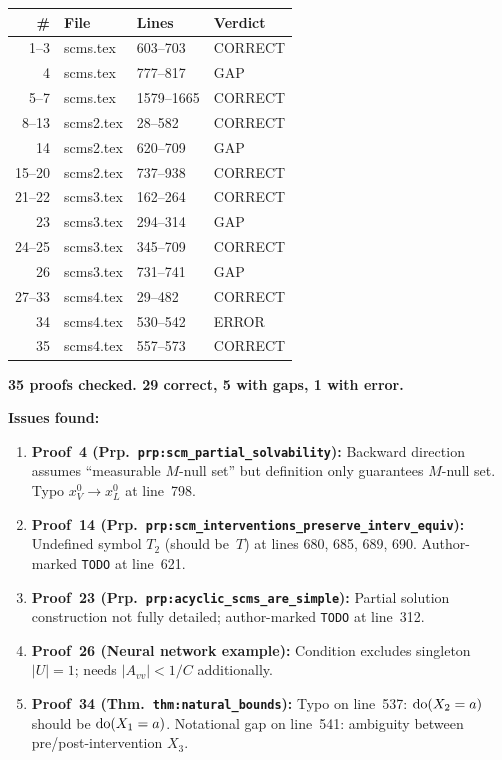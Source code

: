 \documentclass{article}
\begin{document}
\begin{center}
\begin{tabular}{r|l|l|l}
\textbf{\#} & \textbf{File} & \textbf{Lines} & \textbf{Verdict} \\ \hline
1--3   & scms.tex  & 603--703    & CORRECT \\
4      & scms.tex  & 777--817    & GAP \\
5--7   & scms.tex  & 1579--1665  & CORRECT \\
8--13  & scms2.tex & 28--582     & CORRECT \\
14     & scms2.tex & 620--709    & GAP \\
15--20 & scms2.tex & 737--938    & CORRECT \\
21--22 & scms3.tex & 162--264    & CORRECT \\
23     & scms3.tex & 294--314    & GAP \\
24--25 & scms3.tex & 345--709    & CORRECT \\
26     & scms3.tex & 731--741    & GAP \\
27--33 & scms4.tex & 29--482     & CORRECT \\
34     & scms4.tex & 530--542    & ERROR \\
35     & scms4.tex & 557--573    & CORRECT \\
\end{tabular}
\end{center}

\textbf{35 proofs checked.  29 correct, 5 with gaps, 1 with error.}

\bigskip\noindent
\textbf{Issues found:}
\begin{enumerate}
  \item \textbf{Proof~4 (Prp.\ \texttt{prp:scm\_partial\_solvability}):}
    Backward direction assumes ``measurable $M$-null set'' but definition only
    guarantees $M$-null set.  Typo $x_V^0\to x_L^0$ at line~798.
  \item \textbf{Proof~14 (Prp.\ \texttt{prp:scm\_interventions\_preserve\_interv\_equiv}):}
    Undefined symbol $T_2$ (should be~$T$) at lines 680, 685, 689, 690.
    Author-marked \texttt{TODO} at line~621.
  \item \textbf{Proof~23 (Prp.\ \texttt{prp:acyclic\_scms\_are\_simple}):}
    Partial solution construction not fully detailed; author-marked \texttt{TODO}
    at line~312.
  \item \textbf{Proof~26 (Neural network example):}
    Condition excludes singleton $|U|=1$; needs $|A_{vv}|<1/C$ additionally.
  \item \textbf{Proof~34 (Thm.\ \texttt{thm:natural\_bounds}):}
    Typo on line~537: $\operatorname{do}(X_2=a)$ should be $\operatorname{do}(X_1=a)$.
    Notational gap on line~541: ambiguity between pre/post-intervention $X_3$.
\end{enumerate}
\end{document}
